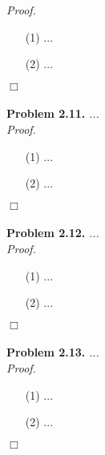 \documentclass{article}
\begin{document}
\emph{Proof.}
\begin{enumerate}
\item[(1)]
  ...

\item[(2)]
  ...
\end{enumerate}
$\Box$ \\\\






\textbf{Problem 2.11.}
\emph{...} \\



\emph{Proof.}
\begin{enumerate}
\item[(1)]
  ...

\item[(2)]
  ...
\end{enumerate}
$\Box$ \\\\






\textbf{Problem 2.12.}
\emph{...} \\



\emph{Proof.}
\begin{enumerate}
\item[(1)]
  ...

\item[(2)]
  ...
\end{enumerate}
$\Box$ \\\\






\textbf{Problem 2.13.}
\emph{...} \\



\emph{Proof.}
\begin{enumerate}
\item[(1)]
  ...

\item[(2)]
  ...
\end{enumerate}
$\Box$ \\\\
\end{document}
